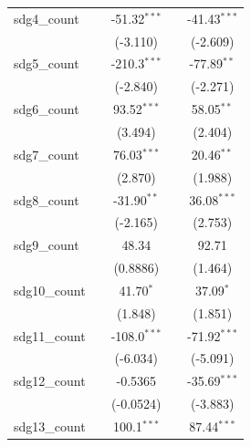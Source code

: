 \begin{tabular}{lcccc}
   sdg4\_count       &                   & -51.32$^{***}$    &                   & -41.43$^{***}$\\   
                     &                   & (-3.110)          &                   & (-2.609)\\   
   sdg5\_count       &                   & -210.3$^{***}$    &                   & -77.89$^{**}$\\   
                     &                   & (-2.840)          &                   & (-2.271)\\   
   sdg6\_count       &                   & 93.52$^{***}$     &                   & 58.05$^{**}$\\   
                     &                   & (3.494)           &                   & (2.404)\\   
   sdg7\_count       &                   & 76.03$^{***}$     &                   & 20.46$^{**}$\\   
                     &                   & (2.870)           &                   & (1.988)\\   
   sdg8\_count       &                   & -31.90$^{**}$     &                   & 36.08$^{***}$\\   
                     &                   & (-2.165)          &                   & (2.753)\\   
   sdg9\_count       &                   & 48.34             &                   & 92.71\\   
                     &                   & (0.8886)          &                   & (1.464)\\   
   sdg10\_count      &                   & 41.70$^{*}$       &                   & 37.09$^{*}$\\   
                     &                   & (1.848)           &                   & (1.851)\\   
   sdg11\_count      &                   & -108.0$^{***}$    &                   & -71.92$^{***}$\\   
                     &                   & (-6.034)          &                   & (-5.091)\\   
   sdg12\_count      &                   & -0.5365           &                   & -35.69$^{***}$\\   
                     &                   & (-0.0524)         &                   & (-3.883)\\   
   sdg13\_count      &                   & 100.1$^{***}$     &                   & 87.44$^{***}$\\   

\end{tabular}
